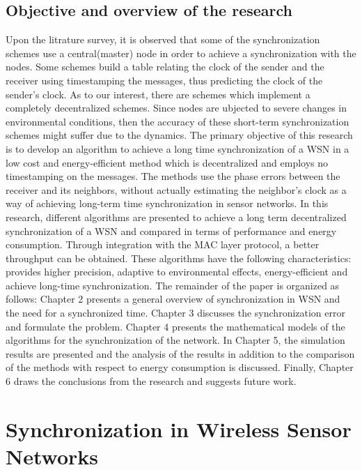 \documentclass[a4paper,10pt]{report}
\begin{document}
\section{\textbf{Objective and overview of the research}}
Upon the litrature survey, it is observed that some of the synchronization schemes use a central(master) node in order to achieve a synchronization with the nodes. Some schemes build a table relating the clock of the sender and the receiver using timestamping the messages, thus predicting the clock of the sender's clock. As to our interest, there are schemes which implement a completely decentralized schemes. Since nodes are ubjected to severe changes in environmental conditions, then the accuracy of these short-term synchronization schemes might suffer due to the dynamics.
\newline
The primary objective of this research is to develop an algorithm to achieve a long time synchronization of a WSN in a low cost and
energy-efficient method which is decentralized and employs no timestamping on the messages. The methods use the phase errors
between the receiver and its neighbors, without actually estimating the neighbor's clock as a way of achieving long-term time synchronization in sensor networks. In this research, different algorithms are presented to achieve a long term decentralized synchronization of a WSN and compared in terms of performance and energy consumption. Through integration with the MAC layer protocol, a better throughput can be obtained. These algorithms have the following characteristics: provides higher precision, adaptive to environmental effects, energy-efficient and achieve long-time synchronization. 
\newline The remainder of the paper is organized as follows:  Chapter 2 presents a general overview of synchronization in WSN and the need
for a synchronized time. Chapter 3 discusses the synchronization error and formulate the problem. Chapter 4 presents the
mathematical models of the algorithms for the synchronization of the network. In Chapter 5, the simulation results are presented and the
analysis of the results in addition to the comparison of the methods with respect to energy consumption is discussed. Finally, Chapter 6
draws the conclusions from the research and suggests future work. 
\chapter{\textbf{Synchronization in Wireless Sensor Networks}}
\end{document}
